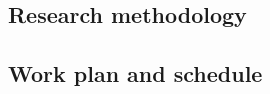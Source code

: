 
\subsection{Research methodology}
\label{subsec:research-methodology}

\subsection{Work plan and schedule}
\label{subsec:work-plan-and-schedule}
